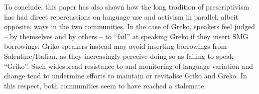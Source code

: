 \documentclass[output=paper,hidelinks]{langscibook}
\begin{document}
To conclude, this paper has also shown how the long tradition of prescriptivism has had direct repercussions on language use and activism in parallel, albeit opposite, ways in the two communities. In the case of Greko, speakers feel judged -- by themselves and by others -- to ``fail'' at speaking Greko if they insert SMG borrowings; Griko speakers instead may avoid inserting borrowings from Salentine/Italian, as they increasingly perceive doing so as failing to speak ``Griko''. Such widespread resistance to and monitoring of language variation and change tend to undermine efforts to maintain or revitalise Griko and Greko. In this respect, both communities seem to have reached a stalemate. 


\sloppy\printbibliography[heading=subbibliography,notkeyword=this]
\end{document}
